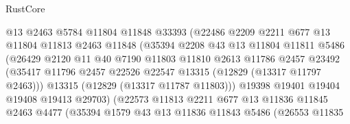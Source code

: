 \begin{lexlean}{RustCore}
\begin{coremodule}
                            @13
                            @2463
                            @5784
                            @11804
                            @11848
                            @33393
                            (@22486
                              @2209
                              @2211
                              @677
                              @13
                              @11804
                              @11813
                              @2463
                              @11848
                              (@35394
                                @2208
                                @43
                                @13
                                @11804
                                @11811
                                @5486
                                (@26429
                                  @2120
                                  @11
                                  @40
                                  @7190
                                  @11803
                                  @11810
                                  @2613
                                  @11786
                                  @2457
                                  @23492
                                  (@35417
                                    @11796
                                    @2457
                                    @22526
                                    @22547
                                    @13315
                                    (@12829 (@13317 @11797 @2463)))
                                  @13315
                                  (@12829 (@13317 @11787 @11803)))
                                @19398
                                @19401
                                @19404
                                @19408
                                @19413
                                @29703)
                              (@22573
                                @11813
                                @2211
                                @677
                                @13
                                @11836
                                @11845
                                @2463
                                @4477
                                (@35394
                                  @1579
                                  @43
                                  @13
                                  @11836
                                  @11843
                                  @5486
                                  (@26553
                                    @11835

\end{coremodule}
\end{lexlean}
